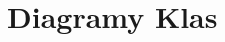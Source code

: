 \documentclass[../Dokumentacja.tex]{subfiles}
\begin{document}
\section{Diagramy Klas}

\end{document}
